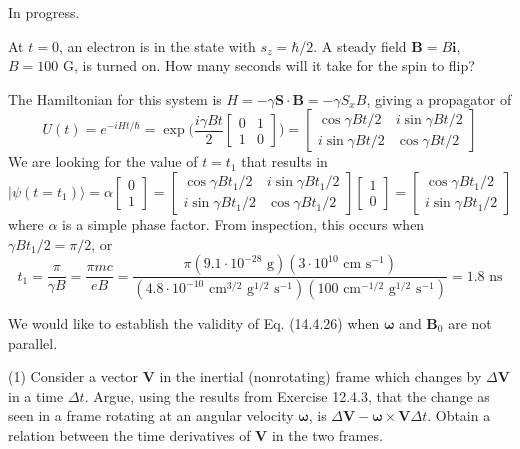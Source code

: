 \documentclass[../principles-of-quantum-mechanics.tex]{subfiles}
\begin{document}
\begin{questions}
\begin{solution}
			
			\color{red}In progress.\color{black}
		\end{solution}
		
		\question At $t = 0$, an electron is in the state with $s_z = \hbar/2$. A steady field $\mathbf{B} = B\mathbf{i}$, $B = 100\text{ G}$, is turned on. How many seconds will it take for the spin to flip?
		
		\begin{solution}
			The Hamiltonian for this system is $H = -\gamma \mathbf{S}\cdot\mathbf{B} = -\gamma S_xB$, giving a propagator of
			$$U(t) = e^{-iHt/\hbar} = \exp\Big({\frac{i\gamma Bt}{2}}\begin{bmatrix}0 & 1 \\ 1 & 0\end{bmatrix}\Big) = \begin{bmatrix}\cos\gamma Bt/2 & i\sin\gamma Bt/2 \\ i\sin \gamma Bt/2 & \cos\gamma Bt/2\end{bmatrix}$$
			We are looking for the value of $t = t_1$ that results in
			$$|\psi(t = t_1)\rangle = \alpha\begin{bmatrix}0 \\ 1 \end{bmatrix} = \begin{bmatrix}\cos\gamma Bt_1/2 & i\sin\gamma Bt_1/2 \\ i\sin \gamma Bt_1/2 & \cos\gamma Bt_1/2\end{bmatrix}\begin{bmatrix}1 \\ 0\end{bmatrix} = \begin{bmatrix}\cos\gamma Bt_1/2 \\ i\sin \gamma Bt_1/2\end{bmatrix}$$
			where $\alpha$ is a simple phase factor. From inspection, this occurs when $\gamma Bt_1/2 = \pi/2$, or
			$$ t_1 = \frac{\pi}{\gamma B} = \frac{\pi mc}{eB} = \frac{\pi(9.1\cdot10^{-28}\text{ g})(3\cdot10^{10}\text{ cm}\text{ s}^{-1})}{(4.8\cdot 10^{-10}\text{ cm}^{3/2}\text{ g}^{1/2}\text{ s}^{-1})(100\text{ cm}^{-1/2}\text{ g}^{1/2}\text{ s}^{-1})} = 1.8\text{ ns}$$
		\end{solution}
		
		\question We would like to establish the validity of Eq. (14.4.26) when $\boldsymbol{\omega}$ and $\mathbf{B}_0$ are not parallel.
		
		(1) Consider a vector $\mathbf{V}$ in the inertial (nonrotating) frame which changes by $\Delta\mathbf{V}$ in a time $\Delta t$. Argue, using the results from Exercise 12.4.3, that the change as seen in a frame rotating at an angular velocity $\boldsymbol{\omega}$, is $\Delta \mathbf{V} - \boldsymbol{\omega}\times\mathbf{V}\Delta t$. Obtain a relation between the time derivatives of $\mathbf{V}$ in the two frames.
		

\end{questions}
\end{document}
